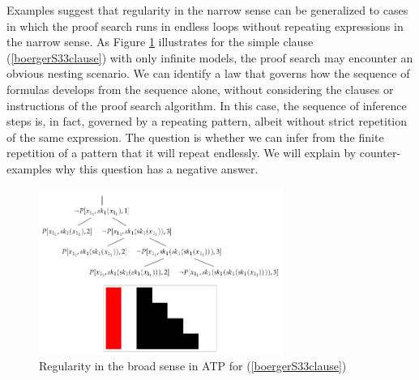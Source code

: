 \documentclass[%
  manuscript=article,   %
  year=2024,
  volume=77,
  doi=00000.000,
]{zfn}
\begin{document}
Examples suggest that regularity in the narrow sense can be generalized to cases in which the proof search runs in endless loops without repeating expressions in the narrow sense. As Figure \ref{quine} illustrates for the simple clause (\ref{boergerS33clause}) with only infinite models, the proof search may encounter an obvious nesting scenario. We can identify a law that governs how the sequence of formulas develops from the sequence alone, without considering the clauses or instructions of the proof search algorithm. In this case, the sequence of inference steps is, in fact, governed by a repeating pattern, albeit without strict repetition of the same expression. The question is whether we can infer from the finite repetition of a pattern that it will repeat endlessly. We will explain by counter-examples why this question has a negative answer.

\begin{figure}[ht]
\begin{center}
\includegraphics[width=8cm]{ART_Lampert/fig2.png}
\end{center}
\caption{Regularity in the broad sense in ATP for (\ref{boergerS33clause})}
    \label{quine}
\end{figure}
\end{document}
